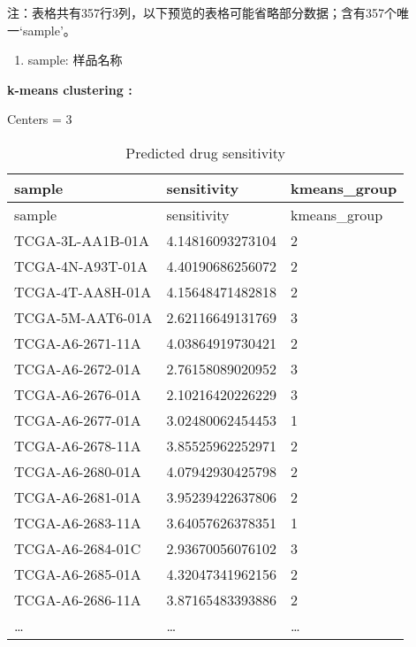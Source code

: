 \documentclass[
]{article}
\providecommand{\tightlist}{%
  \setlength{\itemsep}{0pt}\setlength{\parskip}{0pt}}
\begin{document}
\begin{center}\begin{tcolorbox}[colback=gray!10, colframe=gray!50, width=0.9\linewidth, arc=1mm, boxrule=0.5pt]注：表格共有357行3列，以下预览的表格可能省略部分数据；含有357个唯一`sample'。
\end{tcolorbox}
\end{center}
\begin{center}\begin{tcolorbox}[colback=gray!10, colframe=gray!50, width=0.9\linewidth, arc=1mm, boxrule=0.5pt]\begin{enumerate}\tightlist
\item sample:  样品名称
\end{enumerate}\end{tcolorbox}
\end{center}\begin{center}\begin{tcolorbox}[colback=gray!10, colframe=gray!50, width=0.9\linewidth, arc=1mm, boxrule=0.5pt]
\textbf{
k-means clustering
:}

\vspace{0.5em}

    Centers = 3

\vspace{2em}
\end{tcolorbox}
\end{center}

\begin{longtable}[]{@{}lll@{}}
\caption{\label{tab:Predicted-drug-sensitivity}Predicted drug sensitivity}\tabularnewline
\toprule
sample & sensitivity & kmeans\_group\tabularnewline
\midrule
\endfirsthead
\toprule
sample & sensitivity & kmeans\_group\tabularnewline
\midrule
\endhead
TCGA-3L-AA1B-01A & 4.14816093273104 & 2\tabularnewline
TCGA-4N-A93T-01A & 4.40190686256072 & 2\tabularnewline
TCGA-4T-AA8H-01A & 4.15648471482818 & 2\tabularnewline
TCGA-5M-AAT6-01A & 2.62116649131769 & 3\tabularnewline
TCGA-A6-2671-11A & 4.03864919730421 & 2\tabularnewline
TCGA-A6-2672-01A & 2.76158089020952 & 3\tabularnewline
TCGA-A6-2676-01A & 2.10216420226229 & 3\tabularnewline
TCGA-A6-2677-01A & 3.02480062454453 & 1\tabularnewline
TCGA-A6-2678-11A & 3.85525962252971 & 2\tabularnewline
TCGA-A6-2680-01A & 4.07942930425798 & 2\tabularnewline
TCGA-A6-2681-01A & 3.95239422637806 & 2\tabularnewline
TCGA-A6-2683-11A & 3.64057626378351 & 1\tabularnewline
TCGA-A6-2684-01C & 2.93670056076102 & 3\tabularnewline
TCGA-A6-2685-01A & 4.32047341962156 & 2\tabularnewline
TCGA-A6-2686-11A & 3.87165483393886 & 2\tabularnewline
\ldots{} & \ldots{} & \ldots{}\tabularnewline
\bottomrule
\end{longtable}
\end{document}
